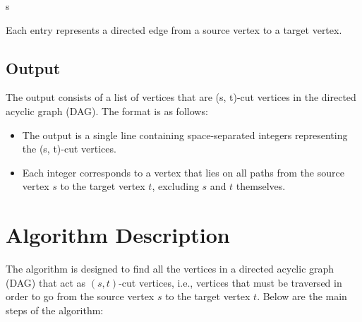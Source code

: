 s\documentclass{article}
\begin{document}
Each entry represents a directed edge from a source vertex to a target vertex.


\subsection*{\Large{Output}}
The output consists of a list of vertices that are (s, t)-cut vertices in the directed acyclic graph (DAG). The format is as follows:

\begin{itemize}
    \item The output is a single line containing space-separated integers representing the (s, t)-cut vertices.
    \item Each integer corresponds to a vertex that lies on all paths from the source vertex \( s \) to the target vertex \( t \), excluding \( s \) and \( t \) themselves.
\end{itemize}

\section*{\huge{Algorithm Description}}

The algorithm is designed to find all the vertices in a directed acyclic graph (DAG) that act as $(s, t)$-cut vertices, i.e., vertices that must be traversed in order to go from the source vertex $s$ to the target vertex $t$. Below are the main steps of the algorithm:
\end{document}
